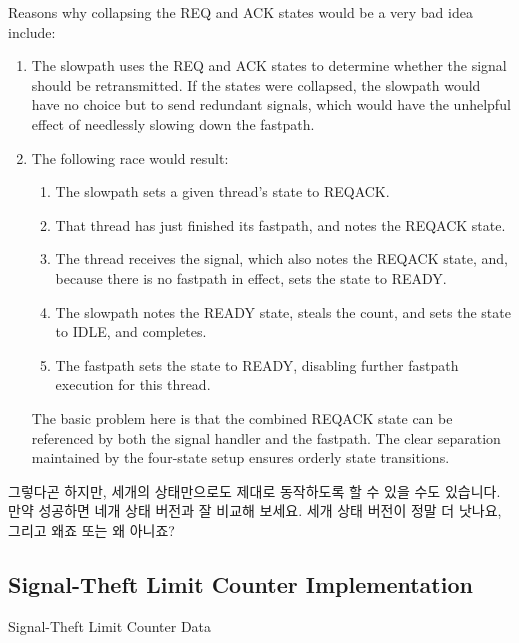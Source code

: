 \begin{lineref}
{	Reasons why collapsing the REQ and ACK states would be a very
	bad idea include:
	\begin{enumerate}
	\item	The slowpath uses the REQ and ACK states to determine
		whether the signal should be retransmitted.
		If the states were collapsed, the slowpath would have
		no choice but to send redundant signals, which would
		have the unhelpful effect of needlessly slowing down
		the fastpath.
	\item	The following race would result:
		\begin{enumerate}
		\item	The slowpath sets a given thread's state to REQACK.
		\item	That thread has just finished its fastpath, and
			notes the REQACK state.
		\item	The thread receives the signal, which also notes
			the REQACK state, and, because there is no fastpath
			in effect, sets the state to READY.
		\item	The slowpath notes the READY state, steals the
			count, and sets the state to IDLE, and completes.
		\item	The fastpath sets the state to READY, disabling
			further fastpath execution for this thread.
		\end{enumerate}
		The basic problem here is that the combined REQACK state
		can be referenced by both the signal handler and the
		fastpath.
		The clear separation maintained by the four-state
		setup ensures orderly state transitions.
	\end{enumerate}
	\fi
	그렇다곤 하지만, 세개의 상태만으로도 제대로 동작하도록 할 수 있을 수도
	있습니다.
	만약 성공하면 네개 상태 버전과 잘 비교해 보세요.
	세개 상태 버전이 정말 더 낫나요, 그리고 왜죠 또는 왜 아니죠?

} \QuickQuizEnd

\subsection{Signal-Theft Limit Counter Implementation}
\label{sec:count:Signal-Theft Limit Counter Implementation}

\begin{listing}[tbp]

\caption{Signal-Theft Limit Counter Data}
\label{lst:count:Signal-Theft Limit Counter Data}
\end{listing}


\end{lineref}
